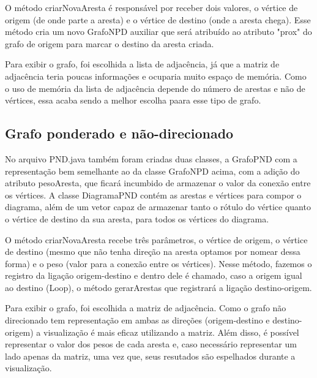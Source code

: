 \documentclass[12pt]{article}
\begin{document}
O método criarNovaAresta é responsável por receber dois valores, o vértice de origem (de onde parte a aresta) e o vértice de destino (onde a aresta chega). Esse método cria um novo GrafoNPD auxiliar que será atribuído ao atributo "prox" do grafo de origem para marcar o destino da aresta criada. 

Para exibir o grafo, foi escolhida a lista de adjacência, já que a matriz de adjacência teria poucas informações e ocuparia muito espaço de memória. Como o uso de memória da lista de adjacência depende do número de arestas e não de vértices, essa acaba sendo a melhor escolha paara esse tipo de grafo.

\subsection{Grafo ponderado e não-direcionado}

No arquivo PND.java também foram criadas duas classes, a GrafoPND com a representação bem semelhante ao da classe GrafoNPD acima, com a adição do atributo pesoAresta, que ficará incumbido de armazenar o valor da conexão entre os vértices. A classe DiagramaPND contém as arestas e vértices para compor o diagrama, além de um vetor capaz de armazenar tanto o rótulo do vértice quanto o vértice de destino da sua aresta, para todos os vértices do diagrama.

O método criarNovaAresta recebe três parâmetros, o vértice de origem, o vértice de destino (mesmo que não tenha direção na aresta optamos por nomear dessa forma) e o peso (valor para a conexão entre os vértices). Nesse método, fazemos o registro da ligação origem-destino e dentro dele é chamado, caso a origem igual ao destino (Loop), o método gerarArestas que registrará a ligação destino-origem.

Para exibir o grafo, foi escolhida a matriz de adjacência. Como o grafo não direcionado tem representação em ambas as direções (origem-destino e destino-origem) a visualização é mais eficaz utilizando a matriz. Além disso, é possível representar o valor dos pesos de cada aresta e, caso necessário representar um lado apenas da matriz, uma vez que, seus resutados são espelhados durante a visualização. 
\end{document}
